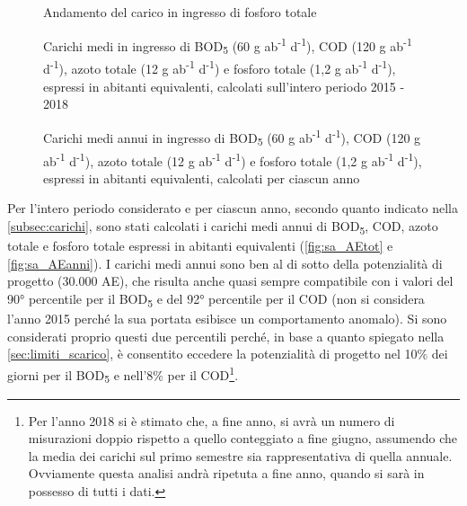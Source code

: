 \begin{figure}[H]
	\centering
	\caption{Andamento del carico in ingresso di fosforo totale}
	\label{fig:sa_car_Ptot}
\end{figure}
\begin{figure}[H]
	\centering
	\caption{Carichi medi in ingresso di BOD\textsubscript{5} (60 g ab\textsuperscript{-1} d\textsuperscript{-1}), COD (120 g ab\textsuperscript{-1} d\textsuperscript{-1}), azoto totale (12 g ab\textsuperscript{-1} d\textsuperscript{-1}) e fosforo totale (1,2 g ab\textsuperscript{-1} d\textsuperscript{-1}), espressi in abitanti equivalenti, calcolati sull'intero periodo 2015 - 2018}
	\label{fig:sa_AEtot}
\end{figure}
\begin{figure}[H]
		\centering
	\caption{Carichi medi annui in ingresso di BOD\textsubscript{5} (60 g ab\textsuperscript{-1} d\textsuperscript{-1}), COD (120 g ab\textsuperscript{-1} d\textsuperscript{-1}), azoto totale (12 g ab\textsuperscript{-1} d\textsuperscript{-1}) e fosforo totale (1,2 g ab\textsuperscript{-1} d\textsuperscript{-1}), espressi in abitanti equivalenti, calcolati per ciascun anno}
	\label{fig:sa_AEanni}
\end{figure}
Per l'intero periodo considerato e per ciascun anno, secondo quanto indicato nella \autoref{subsec:carichi}, sono stati calcolati i carichi medi annui di BOD\textsubscript{5}, COD, azoto totale e fosforo totale espressi in abitanti equivalenti (\autoref{fig:sa_AEtot} e \autoref{fig:sa_AEanni}). I carichi medi annui sono ben al di sotto della potenzialità di progetto (30.000 AE), che risulta anche quasi sempre compatibile con i valori del 90° percentile per il BOD\textsubscript{5} e del 92° percentile per il COD (non si considera l'anno 2015 perché la sua portata esibisce un comportamento anomalo). Si sono considerati proprio questi due percentili perché, in base a quanto spiegato nella \autoref{sec:limiti_scarico}, è consentito eccedere la potenzialità di progetto nel 10\% dei giorni per il BOD\textsubscript{5} e nell'8\% per il COD\footnote{Per l'anno 2018 si è stimato che, a fine anno, si avrà un numero di misurazioni doppio rispetto a quello conteggiato a fine giugno, assumendo che la media dei carichi sul primo semestre sia rappresentativa di quella annuale. Ovviamente questa analisi andrà ripetuta a fine anno, quando si sarà in possesso di tutti i dati.}.


